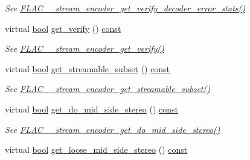\begin{DoxyCompactItemize}
\begin{DoxyCompactList}\small\item\em See \hyperlink{group__flac__stream__encoder_ga3e3f5a9267eb998f74caa10865991bd5}{F\+L\+A\+C\+\_\+\+\_\+stream\+\_\+encoder\+\_\+get\+\_\+verify\+\_\+decoder\+\_\+error\+\_\+stats()} \end{DoxyCompactList}\item 
virtual \hyperlink{mac_2config_2i386_2lib-src_2libsoxr_2soxr-config_8h_abb452686968e48b67397da5f97445f5b}{bool} \hyperlink{class_f_l_a_c_1_1_encoder_1_1_stream_a17e87f0dedf17a67fa025c0aa9b0fb08}{get\+\_\+verify} () \hyperlink{getopt1_8c_a2c212835823e3c54a8ab6d95c652660e}{const} 
\begin{DoxyCompactList}\small\item\em See \hyperlink{group__flac__stream__encoder_ga044d18f93fa8faa6a85eec4fa7cf86f2}{F\+L\+A\+C\+\_\+\+\_\+stream\+\_\+encoder\+\_\+get\+\_\+verify()} \end{DoxyCompactList}\item 
virtual \hyperlink{mac_2config_2i386_2lib-src_2libsoxr_2soxr-config_8h_abb452686968e48b67397da5f97445f5b}{bool} \hyperlink{class_f_l_a_c_1_1_encoder_1_1_stream_a0f2831317683f0808df5cc8cf39ee119}{get\+\_\+streamable\+\_\+subset} () \hyperlink{getopt1_8c_a2c212835823e3c54a8ab6d95c652660e}{const} 
\begin{DoxyCompactList}\small\item\em See \hyperlink{group__flac__stream__encoder_gabafaf69ed39c25c5b1c03044c1a91d66}{F\+L\+A\+C\+\_\+\+\_\+stream\+\_\+encoder\+\_\+get\+\_\+streamable\+\_\+subset()} \end{DoxyCompactList}\item 
virtual \hyperlink{mac_2config_2i386_2lib-src_2libsoxr_2soxr-config_8h_abb452686968e48b67397da5f97445f5b}{bool} \hyperlink{class_f_l_a_c_1_1_encoder_1_1_stream_aef8f86ded1e57f0b1db83b80f63af1a0}{get\+\_\+do\+\_\+mid\+\_\+side\+\_\+stereo} () \hyperlink{getopt1_8c_a2c212835823e3c54a8ab6d95c652660e}{const} 
\begin{DoxyCompactList}\small\item\em See \hyperlink{group__flac__stream__encoder_ga3308e73db9d0ae4803485c35d2a54a2d}{F\+L\+A\+C\+\_\+\+\_\+stream\+\_\+encoder\+\_\+get\+\_\+do\+\_\+mid\+\_\+side\+\_\+stereo()} \end{DoxyCompactList}\item 
virtual \hyperlink{mac_2config_2i386_2lib-src_2libsoxr_2soxr-config_8h_abb452686968e48b67397da5f97445f5b}{bool} \hyperlink{class_f_l_a_c_1_1_encoder_1_1_stream_a867dc6d69b782657b950c95f5ba7ce35}{get\+\_\+loose\+\_\+mid\+\_\+side\+\_\+stereo} () \hyperlink{getopt1_8c_a2c212835823e3c54a8ab6d95c652660e}{const} 

\end{DoxyCompactItemize}
